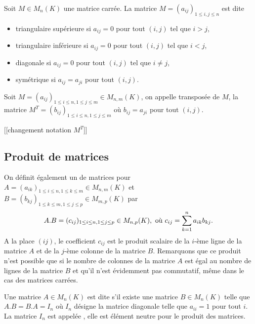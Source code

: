 \documentclass[class=report,crop=false]{standalone}
\begin{document}
\begin{definition}
Soit $M\in M_n(K)$ une matrice carrée. La matrice $M=(a_{ij})_{1\leq i,j\leq n}$ est dite  
\begin{itemize}
  \item triangulaire supérieure si $a_{ij}=0$ pour tout $(i,j)$ tel que $i>j$,
  \item triangulaire inférieure si $a_{ij}=0$ pour tout $(i,j)$ tel que $i<j$,
  \item diagonale si $a_{ij}=0$ pour tout $(i,j)$ tel que $i\neq j$,
  \item symétrique si $a_{ij}=a_{ji}$ pour tout $(i,j)$.
\end{itemize}
  
\end{definition}

\begin{definition}
Soit $M=(a_{ij})_{1\leq i\leq n,1\leq j\leq m}\in M_{n,m}(K)$, on 
appelle transposée de $M$, la matrice $M^T=(b_{ij})_{1\leq i\leq n,1\leq j\leq m}$ 
où $b_{ij}=a_{ji}$ pour tout $(i,j)$. 
\end{definition}

[[changement notation $M^T$]]

\subsection{Produit de matrices}


On définit également un  de matrices pour 
$A=(a_{ik})_{1\leq i\leq n,1\leq k\leq m}\in M_{n,m}(K)$ et 
$B=(b_{kj})_{1\leq k\leq m,1\leq j\leq p}\in M_{m,p}(K)$ par 
$$A.B=(c_{ij})_{1\leq i\leq n,1\leq j\leq p}\in M_{n,p}(K),\ {\hbox{où}}\ c_{ij}=\sum_{k=1}^n a_{ik}b_{kj}.$$
A la place $(ij)$, le coefficient $c_{ij}$ est le produit scalaire de la $i$-ème ligne de la matrice $A$ et de la $j$-ème colonne de la matrice $B$.
Remarquons que ce produit n'est possible que si le nombre de colonnes de la matrice $A$ est égal au nombre de lignes de la matrice $B$ et qu'il n'est évidemment pas commutatif, même dans le cas des matrices carrées.


\begin{definition}
Une matrice $A\in M_n(K)$ est dite  
s'il existe une matrice $B\in M_n(K)$ telle que $A.B=B.A=I_n$ 
où $I_n$ désigne la matrice diagonale telle que $a_{ii}=1$ pour tout $i$. 
La matrice $I_n$ est appelée , elle est élément neutre 
pour le produit des matrices.  
\end{definition}
 
\end{document}
